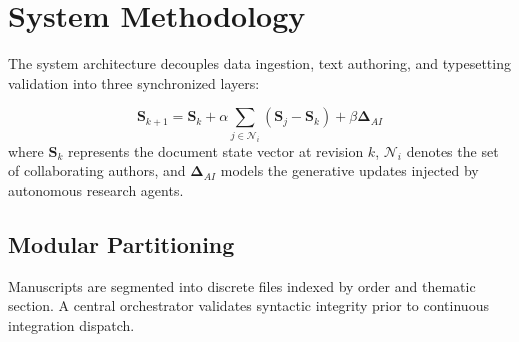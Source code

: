 \section{System Methodology}
\label{sec:methodology}

The system architecture decouples data ingestion, text authoring, and typesetting validation into three synchronized layers:

\begin{equation}
\label{eq:consensus}
\mathbf{S}_{k+1} = \mathbf{S}_k + \alpha \sum_{j \in \mathcal{N}_i} (\mathbf{S}_j - \mathbf{S}_k) + \beta \mathbf{\Delta}_{AI}
\end{equation}
where $\mathbf{S}_k$ represents the document state vector at revision $k$, $\mathcal{N}_i$ denotes the set of collaborating authors, and $\mathbf{\Delta}_{AI}$ models the generative updates injected by autonomous research agents.

\subsection{Modular Partitioning}
Manuscripts are segmented into discrete files indexed by order and thematic section. A central orchestrator validates syntactic integrity prior to continuous integration dispatch.
